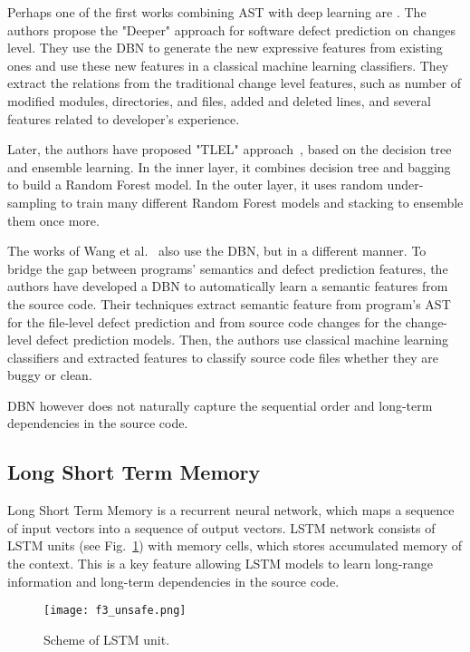 \documentclass{article}
\begin{document}
Perhaps one of the first works combining AST with deep learning are \cite{YangEtAl2015}. The authors propose the "Deeper" approach for software defect prediction on changes level. They use the DBN to generate the new expressive features from existing ones and use these new features in a classical machine learning classifiers. They extract the relations from the traditional change level features, such as number of modified modules, directories, and files, added and deleted lines, and several features related to developer's experience.

Later, the authors have proposed "TLEL" approach~\cite{YangEtAl2017}, based on the decision tree and ensemble learning. In the inner layer, it combines decision tree and bagging to build a Random Forest model. In the outer layer, it uses random under-sampling to train many different Random Forest models and stacking to ensemble them once more.

The works of Wang et al.~\cite{WangEtAl2016, WangEtAl2018} also use the DBN, but in a different manner.
To bridge the gap between programs’ semantics and defect prediction features, the authors have developed a DBN to automatically learn a semantic features from the source code. Their techniques extract semantic feature from program's AST for the file-level defect prediction and from source code changes for the change-level defect prediction models. 
Then, the authors use classical machine learning classifiers and extracted features to classify source code files whether they are buggy or clean.

DBN however does not naturally capture the sequential order and long-term dependencies in the source code.

\subsection{Long Short Term Memory}

Long Short Term Memory is a recurrent neural network, which maps a sequence of input vectors into a sequence of output vectors. LSTM network consists of LSTM units (see Fig.~\ref{fig3}) with memory cells, which stores accumulated memory of the context. This is a key feature allowing LSTM models to learn long-range information and long-term dependencies in the source code.

\begin{figure}[ht] %
\centering
\texttt{[image: f3\_unsafe.png]}
\caption{ Scheme of LSTM unit.}
\label{fig3} %
\end{figure}
\end{document}
